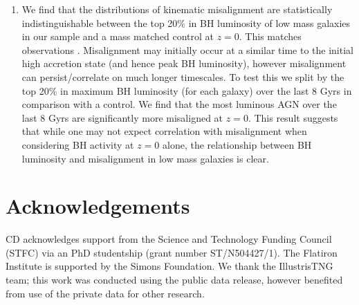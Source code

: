 \documentclass[fleqn,usenatbib]{mnras}
\begin{document}
\begin{enumerate}
    \item We find that the distributions of kinematic misalignment are statistically indistinguishable between the top 20\% in BH luminosity of low mass galaxies in our sample and a mass matched control at $z=0$. This matches observations \citep[see Figure 6 in][]{ilha2019}. Misalignment may initially occur at a similar time to the initial high accretion state (and hence peak BH luminosity), however misalignment can persist/correlate on much longer timescales. To test this we split by the top 20\% in maximum BH luminosity (for each galaxy) over the last 8 Gyrs in comparison with a control. We find that the most luminous AGN over the last 8 Gyrs are significantly more misaligned at $z=0$. This result suggests that while one may not expect correlation with misalignment when considering BH activity at $z=0$ alone, the relationship between BH luminosity and misalignment in low mass galaxies is clear. 
\end{enumerate}


\section*{Acknowledgements}
CD acknowledges support from the Science and Technology Funding Council (STFC) via an PhD studentship (grant number ST/N504427/1). The Flatiron Institute is supported by the Simons Foundation. We thank the IllustrisTNG team; this work was conducted using the public data release, however benefited from use of the private data for other research. 
\end{document}
